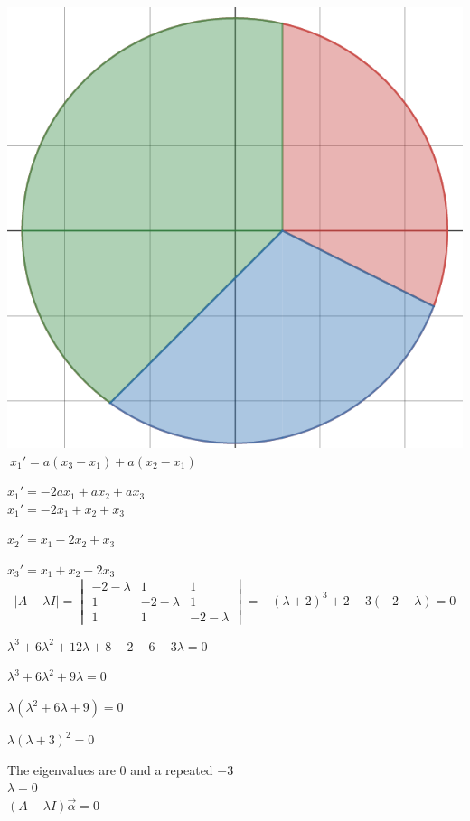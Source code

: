 \documentclass[12pt]{article}
\numberwithin{equation}{subsection}
\newcommand{\absp}[1]{\left\vert #1 \right\vert}
\newcommand{\indc}{\hspace{1.5cm}}
\newcommand{\indd}{\hspace{2cm}}
\newcommand{\indk}{\hspace{5.5cm}}
\newcommand{\indl}{\hspace{6cm}}
\newcommand{\indq}{\hspace{8.5cm}}
\begin{document}
\includegraphics[scale=.25]{SODE1} \indc $ \ x_1'=a(x_3-x_1)+a(x_2-x_1)$

\indl $x_1'=-2ax_1+ax_2+ax_3$\\

\indk $x_1'=-2x_1+x_2+x_3$

\indk $x_2'=x_1-2x_2+x_3$

\indk $x_3'=x_1+x_2-2x_3$\\

$$\absp{A-\lambda I}= \begin{vmatrix}
-2-\lambda & 1 & 1 \\
1 & -2-\lambda & 1 \\
1 & 1 & -2-\lambda 
\end{vmatrix} = -(\lambda +2)^3 +2-3(-2-\lambda)=0 $$

\indq $\lambda^3 +6\lambda^2+12\lambda+8-2 -6 -3\lambda=0$

\indq $\lambda^3 +6\lambda^2+9\lambda=0$

\indq $\lambda(\lambda^2 +6\lambda+9)=0$
 
\indq $\lambda(\lambda+3)^2=0$
\newpage

The eigenvalues are $0$ and a repeated $-3$\\

\indd $\lambda=0$\\

\indd $(A-\lambda I)\vec{\alpha}=0$
\end{document}
